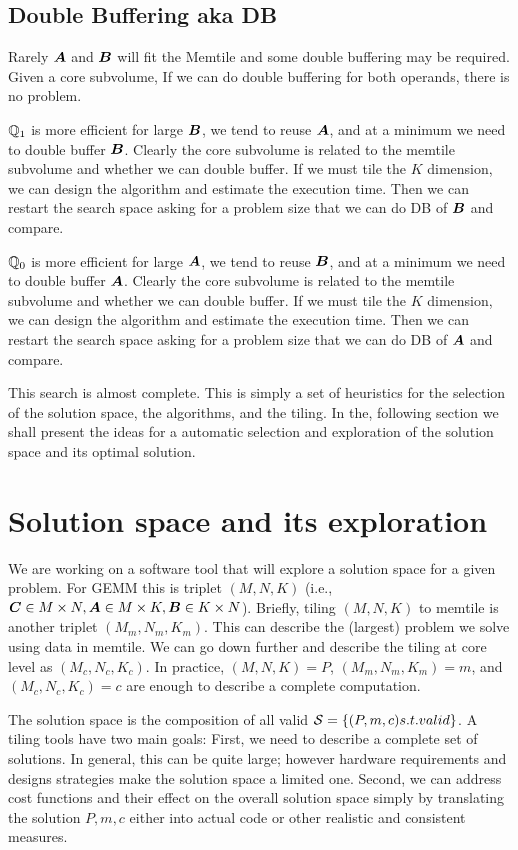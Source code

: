 \documentclass[conference]{IEEEtran}
\begin{document}
\subsection{Double Buffering aka DB}  

Rarely ${\boldsymbol A}$ and ${\boldsymbol B}$ will fit the Memtile and some double
buffering may be required. Given a core subvolume, If we can do double
buffering for both operands, there is no problem.


$\mathbb{Q}_1$ is more efficient for large ${\boldsymbol B}$, we tend to reuse
${\boldsymbol A}$, and at a minimum we need to double buffer ${\boldsymbol B}$. Clearly
the core subvolume is related to the memtile subvolume and whether we
can double buffer. If we must tile the $K$ dimension, we can design
the algorithm and estimate the execution time. Then we can restart the
search space asking for a problem size that we can do DB of ${\boldsymbol B}$
and compare.

$\mathbb{Q}_0$ is more efficient for large ${\boldsymbol A}$, we tend to reuse
${\boldsymbol B}$, and at a minimum we need to double buffer ${\boldsymbol A}$. Clearly
the core subvolume is related to the memtile subvolume and whether we
can double buffer. If we must tile the $K$ dimension, we can design
the algorithm and estimate the execution time. Then we can restart the
search space asking for a problem size that we can do DB of ${\boldsymbol A}$
and compare.

This search is almost complete. This is simply a set of heuristics for
the selection of the solution space, the algorithms, and the tiling.
In the, following section we shall present the ideas for a automatic
selection and exploration of the solution space and its optimal solution.




\section{Solution space and its exploration}
We are working on a software tool that will explore a solution space
for a given problem. For GEMM this is triplet $(M,N,K)$ (i.e., ${\boldsymbol C}
\in M \times N, {\boldsymbol A} \in M \times K, {\boldsymbol B} \in K \times N$). Briefly,
  tiling $(M,N,K)$ to memtile is another triplet $(M_m,N_m,K_m)$. This
  can describe the (largest) problem we solve using data in
  memtile. We can go down further and describe the tiling at core
  level as $(M_c,N_c,K_c)$. In practice, $(M,N,K)=P$,
  $(M_m,N_m,K_m)=m$, and $(M_c,N_c,K_c)=c$ are enough to describe a
  complete computation.

The solution space is the composition of all valid ${\cal S}= \{
(P,m,c) \mbox{ s.t. valid}\}$. A tiling tools have two main goals:
First, we need to describe a complete set of solutions. In general,
this can be quite large; however hardware requirements and designs
strategies make the solution space a limited one. Second, we can address
cost functions and their effect on the overall solution space simply
by translating the solution $P,m,c$ either into actual code or other
realistic and consistent measures.
\end{document}

